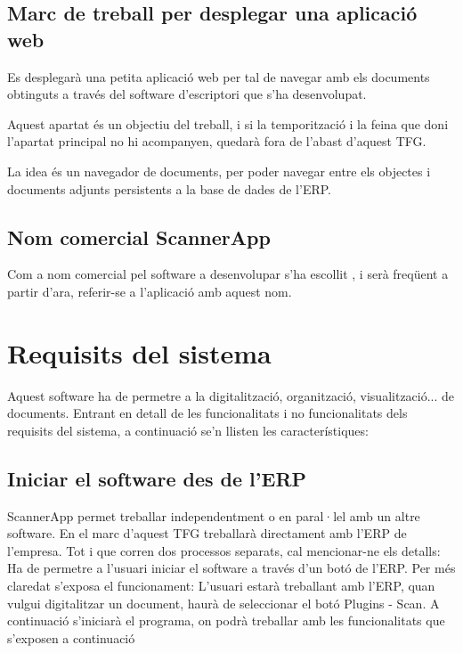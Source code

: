 \documentclass[letterpaper,11pt,catalan]{sphinxmanual}
\begin{document}
\section{Marc de treball per desplegar una aplicació web}
\label{\detokenize{index:marc-de-treball-per-desplegar-una-aplicacio-web}}
Es desplegarà una petita aplicació web per tal de navegar amb els documents obtinguts a través
del software d'escriptori que s'ha desenvolupat.

Aquest apartat és un objectiu del treball, i si la temporització i la feina que doni
l'apartat principal no hi acompanyen, quedarà fora de l'abast d'aquest TFG.

La idea és un navegador de documents, per poder navegar entre els objectes i documents
adjunts persistents a la base de dades de l'ERP.


\section{Nom comercial ScannerApp}
\label{\detokenize{index:nom-comercial-scannerapp}}
Com a nom comercial pel software a desenvolupar s'ha escollit , i serà
freqüent a partir d'ara, referir-se a l'aplicació amb aquest nom.


\chapter{Requisits del sistema}
\label{\detokenize{index:requisits-del-sistema}}
Aquest software ha de permetre a la digitalització, organització, visualització... de
documents. Entrant en detall de les funcionalitats i no funcionalitats dels requisits
del sistema, a continuació se'n llisten les característiques:


\section{Iniciar el software des de l'ERP}
\label{\detokenize{index:iniciar-el-software-des-de-l-erp}}
ScannerApp permet treballar independentment o en paral·lel amb un altre software. En
el marc d'aquest TFG treballarà directament amb l'ERP de l'empresa. Tot i que corren
dos processos separats, cal mencionar-ne els detalls:
Ha de permetre a l'usuari iniciar el software a través d'un botó de l'ERP. Per
més claredat s'exposa el funcionament:
L'usuari estarà treballant amb l'ERP, quan vulgui digitalitzar un document,
haurà de seleccionar el botó \sphinxquotedblleft{}Plugins\sphinxquotedblright{} - \sphinxquotedblleft{}Scan\sphinxquotedblright{}.
A continuació s'iniciarà el programa, on podrà treballar amb les funcionalitats
que s'exposen a continuació
\end{document}
